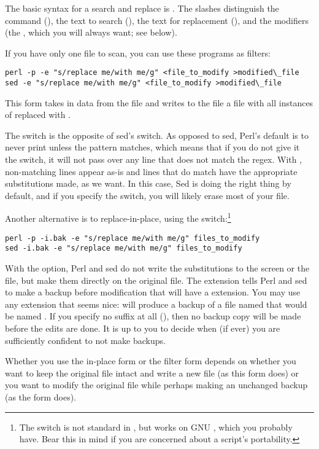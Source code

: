 The basic syntax for a search and replace is .
The slashes distinguish the command (), the text to search
(), the text for replacement (), and the
modifiers (the , which you will always want; see below).

If you have only one file to scan, you can use these programs as
filters:
\begin{lstlisting}
perl -p -e "s/replace me/with me/g" <file_to_modify >modified\_file
sed -e "s/replace me/with me/g" <file_to_modify >modified\_file
\end{lstlisting}
This form takes in data from the \ci{<} file and writes to the \ci{>} file
a file with all instances of  replaced with .

The  switch is the opposite of sed's  switch.
As opposed to sed, Perl's default is to never print
unless the pattern matches, which means that if you do not give it the
 switch, it will not pass over any line that does not match the regex.
With , non-matching lines appear as-is and lines that do match
have the appropriate substitutions made, as we want. 
In this case, Sed is doing the right thing by default, and if you specify
the  switch, you will likely erase
most of your file. 


Another alternative is to replace-in-place, using the 
switch:\footnote{The  switch is not standard in , but
works on GNU , which you probably have. Bear this in mind if you
are concerned about a script's portability.}
\begin{lstlisting}
perl -p -i.bak -e "s/replace me/with me/g" files_to_modify
sed -i.bak -e "s/replace me/with me/g" files_to_modify
\end{lstlisting}
With the  option, Perl and sed do not write
the substitutions to the screen or the \ci{>} file, but
make them directly on the original file. The  extension tells Perl
and sed to make a backup before modification that will have a  extension.
You may use any extension that seems nice:  will produce
a backup of a file named  that would be named .
If you specify no suffix at all (), then no backup copy will be
made before the edits are done. It is up to you to decide when (if ever)
you are sufficiently confident to not make backups.

Whether you use the in-place form or the filter form depends on whether
you want to keep the original file intact and write a new file (as this
form does) or you want to modify the original file while perhaps making
an unchanged backup (as the  form does).

